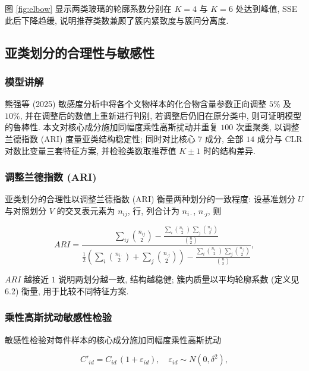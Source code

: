 \documentclass{ctexart}
\begin{document}
图 \ref{fig:elbow} 显示两类玻璃的轮廓系数分别在 $K=4$ 与 $K=6$ 处达到峰值, SSE 此后下降趋缓, 说明推荐类数兼顾了簇内紧致度与簇间分离度.

\subsection{亚类划分的合理性与敏感性}

\subsubsection{模型讲解}

熊强等 (2025) 敏感度分析中将各个文物样本的化合物含量参数正向调整 $5\%$ 及 $10\%$, 并在调整后的数值上重新进行判别, 若调整后仍旧在原分类中, 则可证明模型的鲁棒性. 本文对核心成分施加同幅度乘性高斯扰动并重复 $100$ 次重聚类, 以调整兰德指数 (ARI) 度量亚类结构稳定性; 同时对比核心 $7$ 成分, 全部 $14$ 成分与 CLR 对数比变量三套特征方案, 并检验类数取推荐值 $K\pm1$ 时的结构差异.


\subsubsection{调整兰德指数 (ARI)}

亚类划分的合理性以调整兰德指数 (ARI) 衡量两种划分的一致程度: 设基准划分 $U$ 与对照划分 $V$ 的交叉表元素为 $n_{ij}$, 行, 列合计为 $n_{i\cdot}$, $n_{\cdot{}j}$, 则

\begin{equation*}
ARI=\frac{\sum_{ij}\binom{n_{ij}}{2}-\frac{\sum_{i}\binom{n_{i\cdot}}{2}\,\sum_{j}\binom{n_{\cdot{}j}}{2}}{\binom{n}{2}}}{\frac{1}{2}\left(\sum_{i}\binom{n_{i\cdot}}{2}+\sum_{j}\binom{n_{\cdot{}j}}{2}\right)-\frac{\sum_{i}\binom{n_{i\cdot}}{2}\,\sum_{j}\binom{n_{\cdot{}j}}{2}}{\binom{n}{2}}},
\end{equation*}

$ARI$ 越接近 $1$ 说明两划分越一致, 结构越稳健; 簇内质量以平均轮廓系数 (定义见 6.2) 衡量, 用于比较不同特征方案.


\subsubsection{乘性高斯扰动敏感性检验}

敏感性检验对每件样本的核心成分施加同幅度乘性高斯扰动

\begin{equation*}
C'_{id}=C_{id}\,\left(1+\varepsilon_{id}\right),\quad\varepsilon_{id}\sim{}N\left(0,\delta^{2}\right),
\end{equation*}
\end{document}
